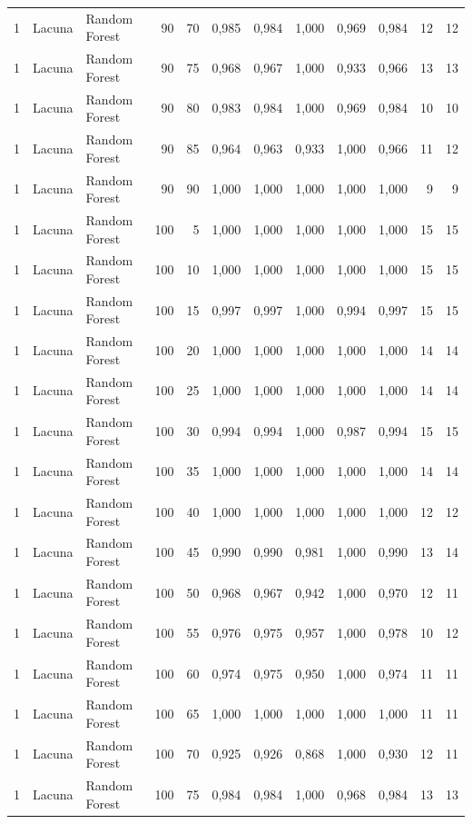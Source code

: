 \begin{longtable}{@{}rllrrrrrrrrr@{}}
1 & Lacuna & Random Forest & 90 & 70 & 0,985 & 0,984 & 1,000 & 0,969 & 0,984 & 12 & 12 \\
1 & Lacuna & Random Forest & 90 & 75 & 0,968 & 0,967 & 1,000 & 0,933 & 0,966 & 13 & 13 \\
1 & Lacuna & Random Forest & 90 & 80 & 0,983 & 0,984 & 1,000 & 0,969 & 0,984 & 10 & 10 \\
1 & Lacuna & Random Forest & 90 & 85 & 0,964 & 0,963 & 0,933 & 1,000 & 0,966 & 11 & 12 \\
1 & Lacuna & Random Forest & 90 & 90 & 1,000 & 1,000 & 1,000 & 1,000 & 1,000 & 9 & 9 \\
1 & Lacuna & Random Forest & 100 & 5 & 1,000 & 1,000 & 1,000 & 1,000 & 1,000 & 15 & 15 \\
1 & Lacuna & Random Forest & 100 & 10 & 1,000 & 1,000 & 1,000 & 1,000 & 1,000 & 15 & 15 \\
1 & Lacuna & Random Forest & 100 & 15 & 0,997 & 0,997 & 1,000 & 0,994 & 0,997 & 15 & 15 \\
1 & Lacuna & Random Forest & 100 & 20 & 1,000 & 1,000 & 1,000 & 1,000 & 1,000 & 14 & 14 \\
1 & Lacuna & Random Forest & 100 & 25 & 1,000 & 1,000 & 1,000 & 1,000 & 1,000 & 14 & 14 \\
1 & Lacuna & Random Forest & 100 & 30 & 0,994 & 0,994 & 1,000 & 0,987 & 0,994 & 15 & 15 \\
1 & Lacuna & Random Forest & 100 & 35 & 1,000 & 1,000 & 1,000 & 1,000 & 1,000 & 14 & 14 \\
1 & Lacuna & Random Forest & 100 & 40 & 1,000 & 1,000 & 1,000 & 1,000 & 1,000 & 12 & 12 \\
1 & Lacuna & Random Forest & 100 & 45 & 0,990 & 0,990 & 0,981 & 1,000 & 0,990 & 13 & 14 \\
1 & Lacuna & Random Forest & 100 & 50 & 0,968 & 0,967 & 0,942 & 1,000 & 0,970 & 12 & 11 \\
1 & Lacuna & Random Forest & 100 & 55 & 0,976 & 0,975 & 0,957 & 1,000 & 0,978 & 10 & 12 \\
1 & Lacuna & Random Forest & 100 & 60 & 0,974 & 0,975 & 0,950 & 1,000 & 0,974 & 11 & 11 \\
1 & Lacuna & Random Forest & 100 & 65 & 1,000 & 1,000 & 1,000 & 1,000 & 1,000 & 11 & 11 \\
1 & Lacuna & Random Forest & 100 & 70 & 0,925 & 0,926 & 0,868 & 1,000 & 0,930 & 12 & 11 \\
1 & Lacuna & Random Forest & 100 & 75 & 0,984 & 0,984 & 1,000 & 0,968 & 0,984 & 13 & 13 \\

\end{longtable}
